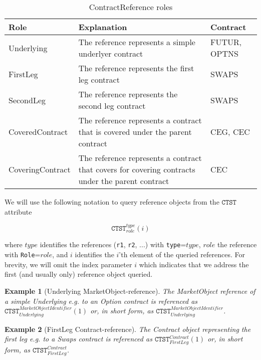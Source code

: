 \documentclass[9pt,oneside]{amsart}
\newtheorem{example}{Example}
\newcommand{\attr}[1]{\texttt{#1}}
\begin{document}
\begin{multicols}{2}
\begin{table}[H]
	\centering
	\begin{tabular}{| p{1.0in}p{1.4in}p{0.5in} |}
	\hline
	\textbf{Role} & \textbf{Explanation} & \textbf{Contract} \\
	\hline
	Underlying & The reference represents a simple underlyer contract & FUTUR, OPTNS \\
	\hline
	FirstLeg & The reference represents the first leg contract & SWAPS \\
	\hline
	SecondLeg & The reference represents the second leg contract & SWAPS \\
	\hline
	CoveredContract & The reference represents a contract that is covered under the parent contract & CEG, CEC \\
	\hline
	CoveringContract & The reference represents a contract that covers for covering contracts under the parent contract & CEC \\
	\hline
	\end{tabular}
	\caption{ContractReference roles}
	\label{tbl:struct-roles}
\end{table}


We will use the following notation to query reference objects from the $\attr{CTST}$ attribute

\[
	\attr{CTST}_{role}^{type}(i)
\]

where $type$ identifies the references (\verb'r1', \verb'r2', ...) with \verb'type'=$type$, $role$ the reference with \verb'Role'=$role$, and $i$ identifies the $i$'th element of the queried references. For brevity, we will omit the index parameter $i$ which indicates that we address the first (and usually only) reference object queried.

\begin{example}[Underlying MarketObject-reference] The MarketObject reference of a simple Underlying e.g. to an Option contract is referenced as $\attr{CTST}_{Underlying}^{MarketObjectIdentifier}(1)$ or, in short form, as $\attr{CTST}_{Underlying}^{MarketObjectIdentifier}$.
\end{example}

\begin{example}[FirstLeg Contract-reference] The Contract object representing the first leg e.g. to a Swaps contract is referenced as $\attr{CTST}_{FirstLeg}^{Contract}(1)$ or, in short form, as $\attr{CTST}_{FirstLeg}^{Contract}$.
\end{example}



\end{multicols}
\end{document}
